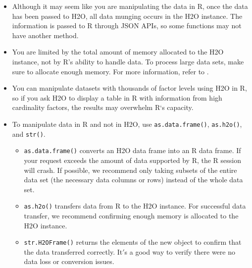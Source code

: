 {\begin{itemize}
\item Although it may seem like you are manipulating the data in R, once the data has been passed to H2O, all data munging occurs in the H2O instance. The information is passed to R through JSON APIs, so some functions may not have another method. 
\item You are limited by the total amount of memory allocated to the H2O instance, not by R's ability to handle data. To process large data sets, make sure to allocate enough memory. For more information, refer to . 
\item You can manipulate datasets with thousands of factor levels using H2O in R, so if you ask H2O to display a table in R with information from high cardinality factors, the results may overwhelm R`s capacity. 
\item To manipulate data in R and not in H2O, use {\texttt{as.data.frame()}}, {\texttt{as.h2o()}}, and {\texttt{str()}}. \begin{itemize}
\item {\texttt{as.data.frame()}} converts an H2O data frame into an R data frame. If your request exceeds the amount of data supported by R, the R session will crash. If possible, we recommend only taking subsets of the entire data set (the necessary data columns or rows) instead of the whole data set. 
\item {\texttt{as.h2o()}} transfers data from R to the H2O instance. For successful data transfer, we recommend confirming enough memory is allocated to the H2O instance.
\item {\texttt{str.H2OFrame()}} returns the elements of the new object to confirm that the data transferred correctly. It$'$s a good way to verify there were no data loss or conversion issues. %
\end{itemize}
\end{itemize}



}
